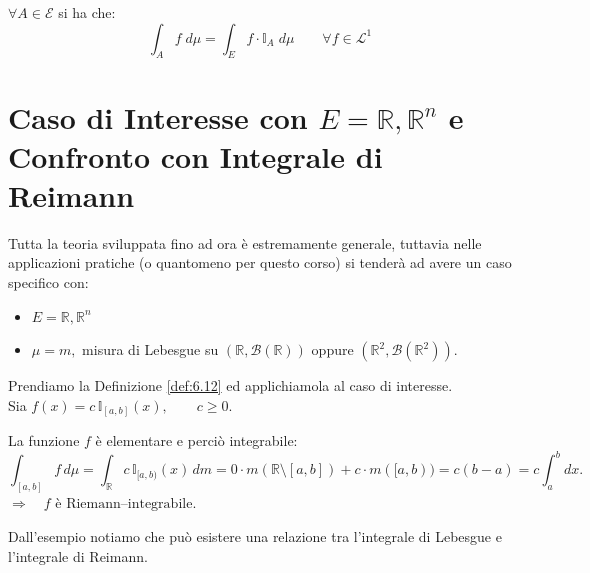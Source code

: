 \begin{definizione}
\label{def:6.12}
    $\forall A\in\mathcal{E}$ si ha che:
    \[\int_A f\;d\mu = \int_E f \cdot \mathbb{I}_{A}\;d\mu\qquad \forall f\in\mathcal{L}^1\]
\end{definizione}

\bigskip
\section{Caso di Interesse con $E = \mathbb{R}, \mathbb{R}^n$ e Confronto con Integrale di Reimann}

Tutta la teoria sviluppata fino ad ora è estremamente generale, tuttavia nelle applicazioni pratiche (o quantomeno per questo corso) si tenderà ad avere un caso specifico con:
\begin{itemize}
    \item $E = \mathbb{R}, \mathbb{R}^n$
    \item $\mu = m, $ misura di Lebesgue su $(\mathbb{R}, \mathcal{B}(\mathbb{R}))$ oppure $(\mathbb{R}^2, \mathcal{B}(\mathbb{R}^2))$.
\end{itemize}

\begin{esempio}
    Prendiamo la Definizione \ref{def:6.12} ed applichiamola al caso di interesse.\\
    Sia \(f(x) = c \, \mathbb{I}_{[a,b]}(x), \qquad c \geq 0.\)
    
\begin{center}
\end{center}
La funzione $f$ è elementare e perciò integrabile:
\[
\int_{[a,b]} f \, d\mu 
= \int_{\mathbb{R}} c\, \mathbb{I}_{[a,b)}(x)\, dm
= 0 \cdot m(\mathbb{R}\setminus [a,b]) 
+ c \cdot m([a,b))
= c(b-a)
= c \int_a^b dx.
\]
\(\Rightarrow \quad f \text{ è Riemann--integrabile.}\)
\end{esempio}

\bigskip
\noindent Dall'esempio notiamo che può esistere una relazione tra l'integrale di Lebesgue e l'integrale di Reimann.

